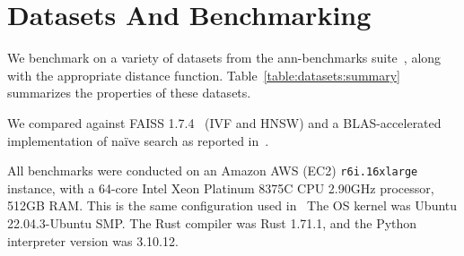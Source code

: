 
\section{Datasets And Benchmarking}
\label{sec:datasets-and-distance-functions}


We benchmark on a variety of datasets from the ann-benchmarks suite~\cite{Aumller2018ANNBenchmarksAB}, 
along with the appropriate distance function.
Table~\ref{table:datasets:summary} summarizes the properties of these datasets.

We compared against FAISS 1.7.4~\cite{johnson2019billion} (IVF and HNSW) and a BLAS-accelerated implementation of na\"ive search as reported in~\cite{johnson2019billion}.

All benchmarks were conducted on an Amazon AWS (EC2) \texttt{r6i.16xlarge} instance, with a 64-core Intel Xeon Platinum 8375C CPU 2.90GHz processor, 512GB RAM.
This is the same configuration used in~\cite{Aumller2018ANNBenchmarksAB}
The OS kernel was Ubuntu 22.04.3-Ubuntu SMP. 
The Rust compiler was Rust 1.71.1, and the Python interpreter version was 3.10.12.





